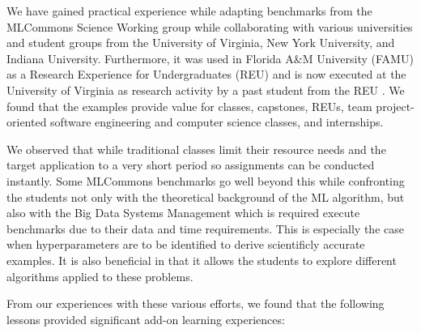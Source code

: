 \documentclass[utf8]{FrontiersinVancouver} %
\begin{document}
We have gained practical experience while adapting benchmarks from the
MLCommons Science Working group while collaborating with various
universities and student groups from the University of Virginia, New
York University, and Indiana University. Furthermore, it was used in
Florida A\&M University (FAMU) as a Research Experience for
Undergraduates (REU) and is now executed at the University of Virginia
as research activity by a past student from the REU
\cite{las-2022-mdpi-crypto}. We found that the examples provide value
for classes, capstones, REUs, team project-oriented software
engineering and computer science classes, and internships.

We observed that while traditional classes limit their resource needs
and the target application to a very short period so assignments
can be conducted instantly.  Some MLCommons benchmarks go well beyond
this while confronting the students not only with the theoretical
background of the ML algorithm, but also with the Big Data Systems Management 
which is required execute benchmarks due to their data and
time requirements. This is especially the
case when hyperparameters are to be identified to derive scientificly
accurate examples. It is also beneficial in that it allows the students to explore different
algorithms applied to these problems.

From our experiences with these various efforts, we found that the
following lessons provided significant add-on learning experiences:
\end{document}
